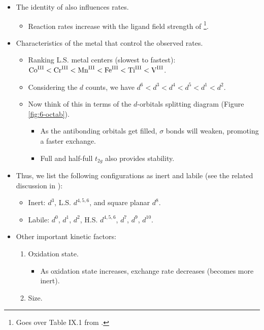 \documentclass[../notes.tex]{subfiles}
\begin{document}
\begin{itemize}
    \item The identity of  also influences rates.
    \begin{itemize}
        \item Reaction rates increase with the ligand field strength of \footnote{Goes over Table IX.1 from \textcite{bib:CHEM20100Notes}.}.
    \end{itemize}
    \item Characteristics of the metal that control the observed rates.
    \begin{itemize}
        \item Ranking L.S. metal centers (slowest to fastest): $\ce{Co^{III}}<\ce{Cr^{III}}<\ce{Mn^{III}}<\ce{Fe^{III}}<\ce{Ti^{III}}<\ce{V^{III}}$.
        \item Considering the $d$ counts, we have $d^6<d^3<d^4<d^5<d^1<d^2$.
        \item Now think of this in terms of the $d$-orbitals splitting diagram (Figure \ref{fig:6-octab}).
        \begin{itemize}
            \item As the antibonding orbitals get filled, $\sigma$ bonds will weaken, promoting a faster exchange.
            \item Full and half-full $t_{2g}$ also provides stability.
        \end{itemize}
    \end{itemize}
    \item Thus, we list the following configurations as inert and labile (see the related discussion in \textcite{bib:CHEM20100Notes}):
    \begin{itemize}
        \item Inert: $d^3$, L.S. $d^{4,5,6}$, and square planar $d^8$.
        \item Labile: $d^0$, $d^1$, $d^2$, H.S. $d^{4,5,6}$, $d^7$, $d^9$, $d^{10}$.
    \end{itemize}
    \item Other important kinetic factors:
    \begin{enumerate}
        \item Oxidation state.
        \begin{itemize}
            \item As oxidation state increases, exchange rate decreases (becomes more inert).
        \end{itemize}
        \item Size.
        \begin{itemize}

\end{itemize}
\end{enumerate}
\end{itemize}
\end{document}
